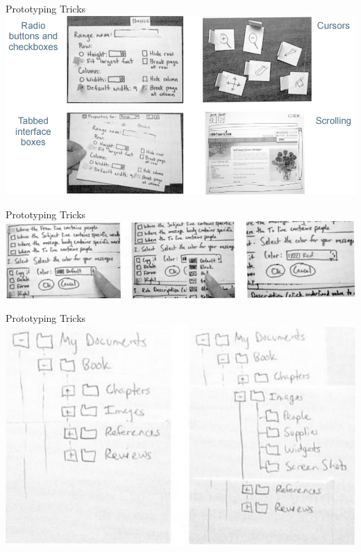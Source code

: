 \documentclass[10pt]{beamer}
\begin{document}
\begin{frame}{Prototyping Tricks}
\centering
	\includegraphics[width=\linewidth]{img/sketchtricks.png}
\end{frame}

\begin{frame}{Prototyping Tricks}
\centering
	\includegraphics[width=\linewidth]{img/dropdown.png}
\end{frame}

\begin{frame}{Prototyping Tricks}
\centering
	\includegraphics[width=\linewidth]{img/expandablelists.png}
\end{frame}
\end{document}
